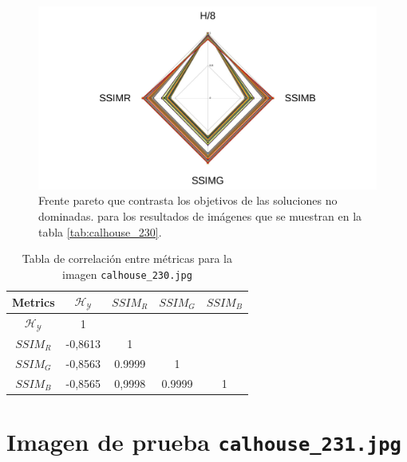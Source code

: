     \begin{figure}[H]
    \centering
    \includegraphics[width=\textwidth]{./Figures/calhouse_230/calhouse_230_2.jpg}
    \caption{Frente pareto que contrasta los objetivos de las soluciones no dominadas. para los resultados de imágenes que se muestran en la tabla \ref{tab:calhouse_230}.}
    \label{fig:calhouse2302fp}
    \end{figure}

\begin{table}[H]
\setlength{\abovecaptionskip}{2pt plus 3pt minus 2pt} %
\caption[Parámetros de entrada para $MOPSO$]{Tabla de correlación entre métricas para la imagen \texttt{calhouse\_230.jpg}}
\begin{center}
 \begin{tabular}{||c | c c c c||} 
 \hline
Metrics & $\mathscr{H_Y}$ & $SSIM_R$ & $SSIM_G$ & $SSIM_B$ \\ 
\hline
$\mathscr{H_Y}$ & 1 &  &  & \\ 
\hline
$SSIM_R$ & -0,8613 & 1 &  \\ 
\hline
$SSIM_G$ & -0,8563 & 0.9999  & 1  & \\ 
\hline
$SSIM_B$ & -0,8565 & 0,9998  & 0.9999  & 1 \\ 
\hline
\end{tabular}
\end{center}
\label{table:correlacion}
\end{table}

\section{Imagen de prueba \texttt{calhouse\_231.jpg}}

